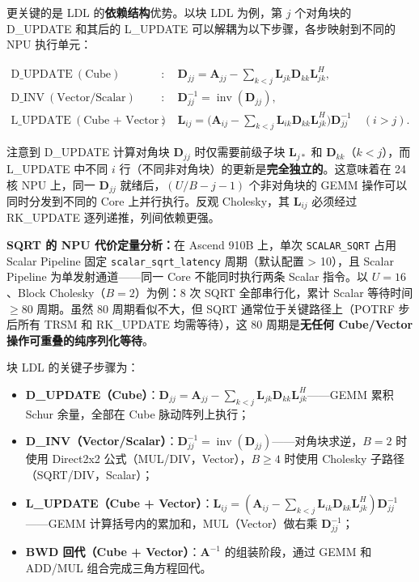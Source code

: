 \documentclass{CjC}
\begin{document}
    更关键的是 LDL 的\textbf{依赖结构}优势。以块 LDL 为例，第 $j$ 个对角块的 D\_UPDATE
    和其后的 L\_UPDATE 可以解耦为以下步骤，各步映射到不同的 NPU 执行单元：

    \begin{align}
        \text{D\_UPDATE}\ (\text{Cube})          & :\quad \bm{D}_{jj}= \bm{A}_{jj}- \sum_{k<j}\bm{L}_{jk}\bm{D}_{kk}\bm{L}_{jk}^{H},                                      \\[2pt]
        \text{D\_INV}\ (\text{Vector/Scalar})    & :\quad \bm{D}_{jj}^{-1}= \operatorname{inv}(\bm{D}_{jj}),                                                              \\[2pt]
        \text{L\_UPDATE}\ (\text{Cube + Vector}) & :\quad \bm{L}_{ij}= \big(\bm{A}_{ij}- \sum_{k<j}\bm{L}_{ik}\bm{D}_{kk}\bm{L}_{jk}^{H}\big)\bm{D}_{jj}^{-1}\quad (i>j).
    \end{align}

    注意到 D\_UPDATE 计算对角块 $\bm{D}_{jj}$ 时仅需要前级子块 $\bm{L}_{j*}$ 和
    $\bm{D}_{kk}$（$k<j$），而 L\_UPDATE 中不同 $i$ 行（不同非对角块）的更新是\textbf{完全独立的}。这意味着在
    24 核 NPU 上，同一 $\bm{D}_{jj}$ 就绪后，$(U/B - j - 1)$ 个非对角块的 GEMM 操作可以同时分发到不同的
    Core 上并行执行。反观 Cholesky，其 $\bm{L}_{ij}$ 必须经过 RK\_UPDATE 逐列递推，列间依赖更强。

    \textbf{SQRT 的 NPU 代价定量分析：}在 Ascend 910B 上，单次 \texttt{SCALAR\_SQRT}
    占用 Scalar Pipeline 固定 \texttt{scalar\_sqrt\_latency} 周期（默认配置 >
    10），且 Scalar Pipeline 为单发射通道——同一 Core 不能同时执行两条 Scalar
    指令。以 $U=16$、Block Cholesky（$B=2$）为例：8 次 SQRT 全部串行化，累计 Scalar
    等待时间 $\ge 80$ 周期。虽然 80 周期看似不大，但 SQRT 通常位于关键路径上（POTRF
    步后所有 TRSM 和 RK\_UPDATE 均需等待），这 80 周期是\textbf{无任何 Cube/Vector
    操作可重叠的纯序列化等待}。

    块 LDL 的关键子步骤为：
    \begin{itemize}
        \item \textbf{D\_UPDATE（Cube）}：$\bm{D}_{jj}=\bm{A}_{jj}-\sum_{k<j}\bm{L}
            _{jk}\bm{D}_{kk}\bm{L}_{jk}^{H}$——GEMM 累积 Schur 余量，全部在 Cube 脉动阵列上执行；

        \item \textbf{D\_INV（Vector/Scalar）}：$\bm{D}_{jj}^{-1}=\operatorname{inv}
            (\bm{D}_{jj})$——对角块求逆，$B=2$ 时使用 Direct2x2 公式（MUL/DIV，Vector），$B
            \geq4$ 时使用 Cholesky 子路径（SQRT/DIV，Scalar）；

        \item \textbf{L\_UPDATE（Cube + Vector）}：$\bm{L}_{ij}=(\bm{A}_{ij}-\sum
            _{k<j}\bm{L}_{ik}\bm{D}_{kk}\bm{L}_{jk}^{H})\bm{D}_{jj}^{-1}$——GEMM 计算括号内的累加和，MUL（Vector）做右乘
            $\bm{D}_{jj}^{-1}$；

        \item \textbf{BWD 回代（Cube + Vector）}：$\bm{A}^{-1}$ 的组装阶段，通过
            GEMM 和 ADD/MUL 组合完成三角方程回代。
    \end{itemize}
\end{document}
